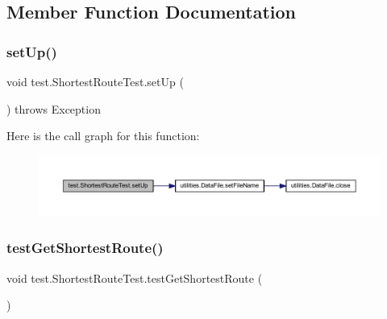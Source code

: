 \subsection{Member Function Documentation}
\mbox{\label{classtest_1_1_shortest_route_test_a26c468579bbd635c5a0e5f0be7852562}} 
\subsubsection{\texorpdfstring{set\+Up()}{setUp()}}
{\footnotesize\ttfamily void test.\+Shortest\+Route\+Test.\+set\+Up (\begin{DoxyParamCaption}{ }\end{DoxyParamCaption}) throws Exception}

Here is the call graph for this function\+:\nopagebreak
\begin{figure}[H]
\begin{center}
\leavevmode
\includegraphics[width=350pt]{classtest_1_1_shortest_route_test_a26c468579bbd635c5a0e5f0be7852562_cgraph}
\end{center}
\end{figure}
\mbox{\label{classtest_1_1_shortest_route_test_a2471bd1b489d85e9430575247c9b2231}} 
\subsubsection{\texorpdfstring{test\+Get\+Shortest\+Route()}{testGetShortestRoute()}}
{\footnotesize\ttfamily void test.\+Shortest\+Route\+Test.\+test\+Get\+Shortest\+Route (\begin{DoxyParamCaption}{ }\end{DoxyParamCaption})}

